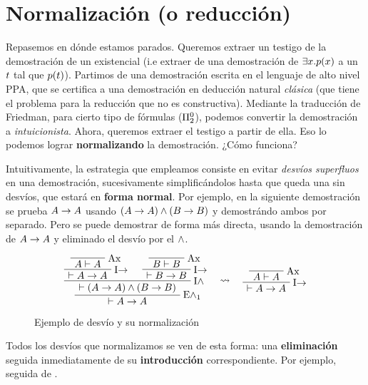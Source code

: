 \section{Normalización (o reducción)}
\label{fri:sec:reduction}

Repasemos en dónde estamos parados. Queremos extraer un testigo de la demostración de un existencial (i.e extraer de una demostración de  $\exists x . p(x)$ a un $t$ tal que $p(t)$). Partimos de una demostración escrita en el lenguaje de alto nivel PPA, que se certifica a una demostración en deducción natural \textit{clásica} (que tiene el problema para la reducción que no es constructiva). Mediante la traducción de Friedman, para cierto tipo de fórmulas ($\Pi^0_{2}$), podemos convertir la demostración a \textit{intuicionista}. Ahora, queremos extraer el testigo a partir de ella. Eso lo podemos lograr \textbf{normalizando} la demostración. ¿Cómo funciona?

Intuitivamente, la estrategia que empleamos consiste en evitar \textit{desvíos superfluos} en una demostración, sucesivamente simplificándolos hasta que queda una sin desvíos, que estará en \textbf{forma normal}. Por ejemplo, en la siguiente demostración se prueba $A \to A$ usando $(A \to A) \wedge (B \to B)$ y demostrándo ambos por separado. Pero se puede demostrar de forma más directa, usando la demostración de $A \to A$ y eliminado el desvío por el $\wedge$.

\begin{figure}[H]
\[
    \AxiomC{}
    \RL{\ruleAx}
    \UnaryInfC{$\form \judG \form$}
    \RL{\ruleImpI}
    \UnaryInfC{$\judG \form \fImp \form$}
    \AxiomC{}
    \RL{\ruleAx}
    \UnaryInfC{$\formTwo \judG \formTwo$}
    \RL{\ruleImpI}
    \UnaryInfC{$\judG \formTwo \fImp \formTwo$}
    \RL{\ruleAndI}
    \BinaryInfC{$\judG (\form \fImp \form) \fAnd (\formTwo \fImp \formTwo)$}
    \RL{\ruleAndEOne{}}
    \UnaryInfC{$\judG \form \fImp \form$}
\DisplayProof
\quad
\rewrite
\quad
    \AxiomC{}
    \RL{\ruleAx}
    \UnaryInfC{$\form \judG \form$}
    \RL{\ruleImpI}
    \UnaryInfC{$\judG \form \fImp \form$}
    \DisplayProof
\]
\caption{Ejemplo de desvío y su normalización}
\end{figure}

Todos los desvíos que normalizamos se ven de esta forma: una \textbf{eliminación} seguida inmediatamente de su \textbf{introducción} correspondiente. Por ejemplo,  seguida de .

